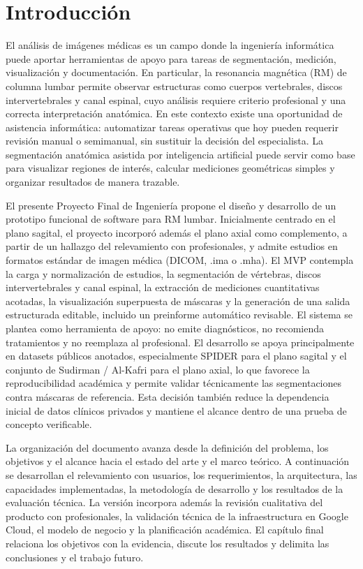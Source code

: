 \chapter{Introducción}

El análisis de imágenes médicas es un campo donde la ingeniería informática puede aportar herramientas de apoyo para tareas de segmentación, medición, visualización y documentación. En particular, la resonancia magnética (RM) de columna lumbar permite observar estructuras como cuerpos vertebrales, discos intervertebrales y canal espinal, cuyo análisis requiere criterio profesional y una correcta interpretación anatómica. En este contexto existe una oportunidad de asistencia informática: automatizar tareas operativas que hoy pueden requerir revisión manual o semimanual, sin sustituir la decisión del especialista. La segmentación anatómica asistida por inteligencia artificial puede servir como base para visualizar regiones de interés, calcular mediciones geométricas simples y organizar resultados de manera trazable.

El presente Proyecto Final de Ingeniería propone el diseño y desarrollo de un prototipo funcional de software para RM lumbar. Inicialmente centrado en el plano sagital, el proyecto incorporó además el plano axial como complemento, a partir de un hallazgo del relevamiento con profesionales, y admite estudios en formatos estándar de imagen médica (DICOM, .ima o .mha). El MVP contempla la carga y normalización de estudios, la segmentación de vértebras, discos intervertebrales y canal espinal, la extracción de mediciones cuantitativas acotadas, la visualización superpuesta de máscaras y la generación de una salida estructurada editable, incluido un preinforme automático revisable. El sistema se plantea como herramienta de apoyo: no emite diagnósticos, no recomienda tratamientos y no reemplaza al profesional. El desarrollo se apoya principalmente en datasets públicos anotados, especialmente SPIDER para el plano sagital y el conjunto de Sudirman / Al-Kafri para el plano axial, lo que favorece la reproducibilidad académica y permite validar técnicamente las segmentaciones contra máscaras de referencia. Esta decisión también reduce la dependencia inicial de datos clínicos privados y mantiene el alcance dentro de una prueba de concepto verificable.

La organización del documento avanza desde la definición del problema, los objetivos y el alcance hacia el estado del arte y el marco teórico. A continuación se desarrollan el relevamiento con usuarios, los requerimientos, la arquitectura, las capacidades implementadas, la metodología de desarrollo y los resultados de la evaluación técnica. La versión incorpora además la revisión cualitativa del producto con profesionales, la validación técnica de la infraestructura en Google Cloud, el modelo de negocio y la planificación académica. El capítulo final relaciona los objetivos con la evidencia, discute los resultados y delimita las conclusiones y el trabajo futuro.
